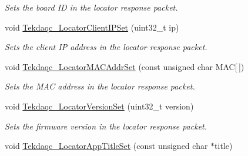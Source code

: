 \begin{DoxyCompactItemize}
\begin{DoxyCompactList}\small\item\em Sets the board I\-D in the locator response packet. \end{DoxyCompactList}\item 
void \hyperlink{group__tekdaqc__locator_ga841da02fec8e79caad0f1d3db9a7af73}{Tekdaqc\-\_\-\-Locator\-Client\-I\-P\-Set} (uint32\-\_\-t ip)
\begin{DoxyCompactList}\small\item\em Sets the client I\-P address in the locator response packet. \end{DoxyCompactList}\item 
void \hyperlink{group__tekdaqc__locator_gaedcc9e5e10826ca40b253bdc274e65cf}{Tekdaqc\-\_\-\-Locator\-M\-A\-C\-Addr\-Set} (const unsigned char M\-A\-C\mbox{[}$\,$\mbox{]})
\begin{DoxyCompactList}\small\item\em Sets the M\-A\-C address in the locator response packet. \end{DoxyCompactList}\item 
void \hyperlink{group__tekdaqc__locator_ga852fe5c43e378a8621913254a3e00bd1}{Tekdaqc\-\_\-\-Locator\-Version\-Set} (uint32\-\_\-t version)
\begin{DoxyCompactList}\small\item\em Sets the firmware version in the locator response packet. \end{DoxyCompactList}\item 
\hypertarget{group__tekdaqc__locator_gadcd8af9370fe58374d5355c66651b620}{void \hyperlink{group__tekdaqc__locator_gadcd8af9370fe58374d5355c66651b620}{Tekdaqc\-\_\-\-Locator\-App\-Title\-Set} (const unsigned char $\ast$title)}\label{group__tekdaqc__locator_gadcd8af9370fe58374d5355c66651b620}


\end{DoxyCompactItemize}
